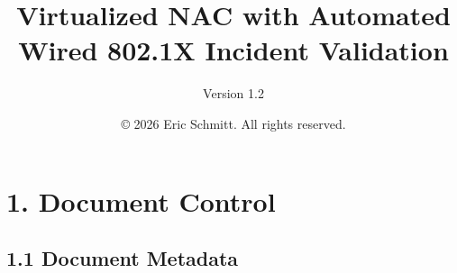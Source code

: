 \documentclass[11pt]{article}
\title{Virtualized NAC with Automated Wired 802.1X Incident Validation}
\subtitle{Version 1.2}
\author{© 2026 Eric Schmitt. All rights reserved.}
\begin{document}
\maketitle
\thispagestyle{empty}
\newpage


\section{1. Document Control}
\label{sec:document-control}


\subsection{1.1 Document Metadata}
\label{sec:document-metadata}
\end{document}
